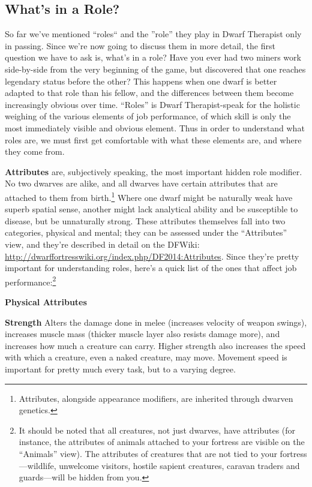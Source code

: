 \documentclass[]{article}
\newcommand{\boldlist}[1] {
\vspace{12pt}
\noindent \textbf{#1}
}
\begin{document}
\subsection{What's in a Role?}
\label{What's in a Role?}
So far we've mentioned ``roles`` and the ''role'' they play in  Dwarf Therapist only in passing. Since we're
now going to discuss them in more detail, the first question we have to ask is, what's in a role?
Have you ever had two miners work side-by-side from the very beginning of the game, but
discovered that one reaches legendary status before the other? This happens when one dwarf is
better adapted to that role than his fellow, and the differences between them become increasingly
obvious over time. ``Roles'' is Dwarf Therapist-speak for the holistic weighing of the various
elements of job performance, of which skill is only the most immediately visible and obvious element.
Thus in order to understand what roles are, we must first get comfortable with what these elements are,
and where they come from.

\textbf{Attributes} are, subjectively speaking, the most important hidden role modifier. No two
dwarves are alike, and all dwarves have certain attributes that are attached to them from
birth.\footnote{Attributes, alongside appearance modifiers, are inherited through dwarven genetics.}
Where one dwarf might be naturally weak have superb spatial sense, another might lack analytical
ability and be susceptible to disease, but be unnaturally strong. These attributes themselves fall into
two categories, physical and mental; they can be assessed under the ``Attributes'' view, and they're
described in detail on the DFWiki: \url{http://dwarffortresswiki.org/index.php/DF2014:Attributes}. Since
they're pretty important for understanding roles, here's a quick list of the ones that affect job
performance:\footnote{It should be noted that all creatures, not just dwarves, have attributes (for
instance, the attributes of animals attached to your fortress are visible on the ``Animals'' view). The
attributes of creatures that are not tied to your fortress---wildlife, unwelcome visitors, hostile
sapient creatures, caravan traders and guards---will be hidden from you.}

\boldlist{\indent Physical Attributes}

\boldlist{Strength} Alters the damage done in melee (increases velocity
of weapon swings), increases muscle mass (thicker muscle layer also resists damage more), and increases
how much a creature can carry. Higher strength also increases the speed with which a creature, even a
naked creature, may move. Movement speed is important for pretty much every task, but to a varying
degree.
\end{document}
